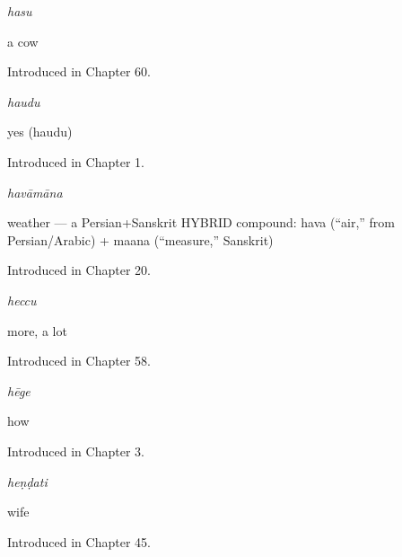 \noindent\begin{minipage}[t]{\linewidth}
\raggedright
\textbf{}\enspace\emph{hasu}\par
\small a cow\par
\footnotesize Introduced in Chapter 60.
\end{minipage}\par\medskip

\noindent\begin{minipage}[t]{\linewidth}
\raggedright
\textbf{}\enspace\emph{haudu}\par
\small yes (haudu)\par
\footnotesize Introduced in Chapter 1.
\end{minipage}\par\medskip

\noindent\begin{minipage}[t]{\linewidth}
\raggedright
\textbf{}\enspace\emph{havāmāna}\par
\small weather — a Persian+Sanskrit HYBRID compound: hava (\textquotedblleft{}air,\textquotedblright{} from Persian/Arabic) + maana (\textquotedblleft{}measure,\textquotedblright{} Sanskrit)\par
\footnotesize Introduced in Chapter 20.
\end{minipage}\par\medskip

\noindent\begin{minipage}[t]{\linewidth}
\raggedright
\textbf{}\enspace\emph{heccu}\par
\small more, a lot\par
\footnotesize Introduced in Chapter 58.
\end{minipage}\par\medskip

\noindent\begin{minipage}[t]{\linewidth}
\raggedright
\textbf{}\enspace\emph{hēge}\par
\small how\par
\footnotesize Introduced in Chapter 3.
\end{minipage}\par\medskip

\noindent\begin{minipage}[t]{\linewidth}
\raggedright
\textbf{}\enspace\emph{heṇḍati}\par
\small wife\par
\footnotesize Introduced in Chapter 45.
\end{minipage}\par\medskip


